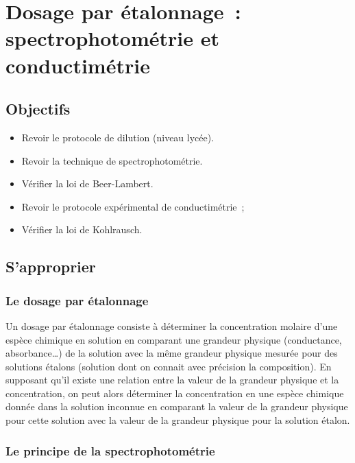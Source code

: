 \documentclass[a4paper, 11pt, final, garamond]{book}
\begin{document}
\setcounter{chapter}{8}

\chapter{Dosage par \'etalonnage~: spectrophotom\'etrie et conductim\'etrie}

\section{Objectifs}

\begin{itemize}
    \item Revoir le protocole de dilution (niveau lycée).
    \item Revoir la technique de spectrophotométrie.
    \item Vérifier la loi de Beer-Lambert.
    \item Revoir le protocole expérimental de conductimétrie~;
    \item Vérifier la loi de Kohlrausch.
\end{itemize}

\section{S'approprier}

\subsection{Le dosage par étalonnage}

Un dosage par étalonnage consiste à déterminer la concentration molaire d'une
espèce chimique en solution en comparant une grandeur physique (conductance,
absorbance…) de la solution avec la même grandeur physique mesurée pour des
solutions étalons (solution dont on connait avec précision la composition). En
supposant qu'il existe une relation entre la valeur de la grandeur physique et
la concentration, on peut alors déterminer la concentration en une espèce
chimique donnée dans la solution inconnue en comparant la valeur de la grandeur
physique pour cette solution avec la valeur de la grandeur physique pour la
solution étalon.

\subsection{Le principe de la spectrophotométrie}
\end{document}
